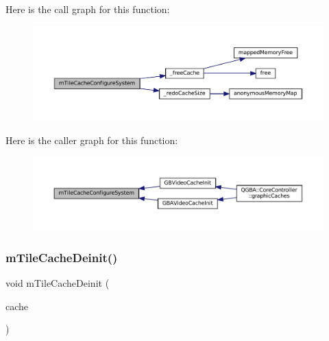 Here is the call graph for this function\+:
\nopagebreak
\begin{figure}[H]
\begin{center}
\leavevmode
\includegraphics[width=350pt]{tile-cache_8c_a17c8e2e1e7c0b387bcf886e51b3c1fa1_cgraph}
\end{center}
\end{figure}
Here is the caller graph for this function\+:
\nopagebreak
\begin{figure}[H]
\begin{center}
\leavevmode
\includegraphics[width=350pt]{tile-cache_8c_a17c8e2e1e7c0b387bcf886e51b3c1fa1_icgraph}
\end{center}
\end{figure}
\mbox{\label{tile-cache_8c_a1426fbd1e5ca5db4617a2fc1745e2590}} 
\subsubsection{\texorpdfstring{m\+Tile\+Cache\+Deinit()}{mTileCacheDeinit()}}
{\footnotesize\ttfamily void m\+Tile\+Cache\+Deinit (\begin{DoxyParamCaption}\item[{struct m\+Tile\+Cache $\ast$}]{cache }\end{DoxyParamCaption})}

